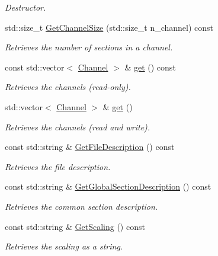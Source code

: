 \begin{DoxyCompactItemize}
\begin{DoxyCompactList}\small\item\em Destructor. \item\end{DoxyCompactList}\item 
std::size\_\-t \hyperlink{classRecording_a63e3ccf892626f33082c82de2897ed08}{GetChannelSize} (std::size\_\-t n\_\-channel) const 
\begin{DoxyCompactList}\small\item\em Retrieves the number of sections in a channel. \item\end{DoxyCompactList}\item 
const std::vector$<$ \hyperlink{classChannel}{Channel} $>$ \& \hyperlink{classRecording_a5156de9f9f9bb71b0b39de838a0031f2}{get} () const 
\begin{DoxyCompactList}\small\item\em Retrieves the channels (read-\/only). \item\end{DoxyCompactList}\item 
std::vector$<$ \hyperlink{classChannel}{Channel} $>$ \& \hyperlink{classRecording_aeb8d43d6ee2fed242fe49e1a238b2ae2}{get} ()
\begin{DoxyCompactList}\small\item\em Retrieves the channels (read and write). \item\end{DoxyCompactList}\item 
const std::string \& \hyperlink{classRecording_a6070a9a8cf66efbb6ed5e1e0c7fc0263}{GetFileDescription} () const 
\begin{DoxyCompactList}\small\item\em Retrieves the file description. \item\end{DoxyCompactList}\item 
const std::string \& \hyperlink{classRecording_a44d232789cf4f3918dd61baafd4b7071}{GetGlobalSectionDescription} () const 
\begin{DoxyCompactList}\small\item\em Retrieves the common section description. \item\end{DoxyCompactList}\item 
const std::string \& \hyperlink{classRecording_a83060d2146fa05eacfee71ffaa17caa5}{GetScaling} () const 
\begin{DoxyCompactList}\small\item\em Retrieves the scaling as a string. \item\end{DoxyCompactList}\item 

\end{DoxyCompactItemize}
